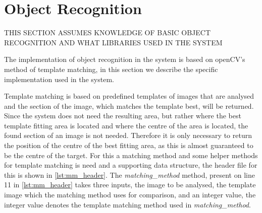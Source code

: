\section{Object Recognition}
\uppercase{this section assumes knowledge of basic object recognition and what libraries used in the system}

The implementation of object recognition in the system is based on openCV's method of template matching, in this section we describe the specific implementation used in the system.

Template matching is based on predefined templates of images that are analysed and the section of the image, which matches the template best, will be returned. 
Since the system does not need the resulting area, but rather where the best template fitting area is located and where the centre of the area is located, the found section of an image is not needed. Therefore it is only necessary to return the position of the centre of the best fitting area, as this is almost guaranteed to be the centre of the target. 
For this a matching method and some helper methods for template matching is need and a supporting data structure, the header file for this is shown in \cref{lst:mm_header}. The \emph{matching\_method} method, present on line 11 in \cref{lst:mm_header} takes three inputs, the image to be analysed, the template image which the matching method uses for comparison, and an integer value, the integer value denotes the template matching method used in \emph{matching\_method}.

